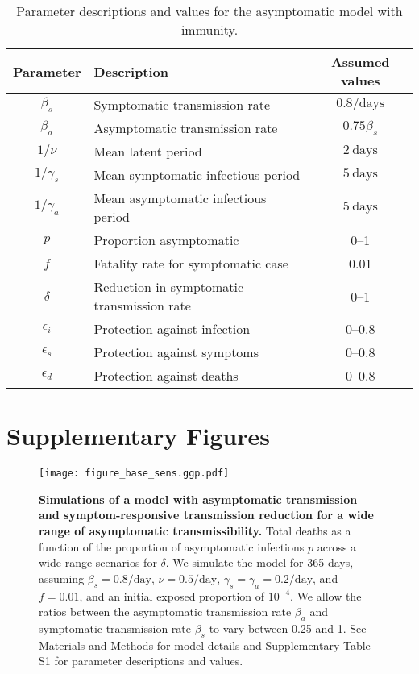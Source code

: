 \documentclass[12pt]{article}
\begin{document}
\begin{table}[h!]
  \begin{center}
    \begin{tabular}{c|l|c} %
      \textbf{Parameter} & \textbf{Description} & \textbf{Assumed values}\\
      \hline
      $\beta_s$ & Symptomatic transmission rate & $0.8/\mathrm{days}$\\
      \hline
      $\beta_a$ & Asymptomatic transmission rate & $0.75 \beta_s$ \\
      \hline
      $1/\nu$ & Mean latent period & $2\ \mathrm{days}$\\
      \hline
      $1/\gamma_s$ & Mean symptomatic infectious period & $5\ \mathrm{days}$\\
      \hline
      $1/\gamma_a$ & Mean asymptomatic infectious period & $5\ \mathrm{days}$\\
      \hline
      $p$ & Proportion asymptomatic & 0--1\\
      \hline
      $f$ & Fatality rate for symptomatic case & 0.01\\
      \hline
      $\delta$ & Reduction in symptomatic transmission rate & 0--1\\
      \hline
      $\epsilon_i$ & Protection against infection & 0--0.8\\
      \hline
      $\epsilon_s$ & Protection against symptoms & 0--0.8\\
      \hline
      $\epsilon_d$ & Protection against deaths & 0--0.8\\
    \end{tabular}
    \caption{Parameter descriptions and values for the asymptomatic model with immunity.}
    \label{tab:table3}
  \end{center}
\end{table}

\pagebreak

\section*{Supplementary Figures}

\begin{figure}[!ht]
\begin{center}
\texttt{[image: figure\_base\_sens.ggp.pdf]}
\caption{
\textbf{Simulations of a model with asymptomatic transmission and symptom-responsive transmission reduction for a wide range of asymptomatic transmissibility.}
Total deaths as a function of the proportion of asymptomatic infections $p$ across a wide range scenarios for $\delta$.
We simulate the model for 365 days, assuming $\beta_s = 0.8/\mathrm{day}$, $\nu=0.5/\mathrm{day}$, $\gamma_s=\gamma_a=0.2/\mathrm{day}$, and $f=0.01$, and an initial exposed proportion of $10^{-4}$.
We allow the ratios between the asymptomatic transmission rate $\beta_a$ and symptomatic transmission rate $\beta_s$ to vary between 0.25 and 1.
See Materials and Methods for model details and Supplementary Table S1 for parameter descriptions and values.
}
\end{center}
\end{figure}
\end{document}
